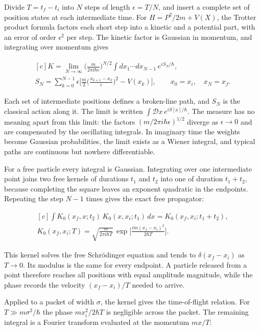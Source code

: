 \documentclass[11pt,oneside]{book}
\newenvironment{centeredalign}{\[\begin{gathered}[c]}{\end{gathered}\]}
\begin{document}
Divide \(T=t_f-t_i\) into \(N\) steps of length \(\epsilon=T/N\), and insert a complete set of position states at each intermediate time. For \(H=P^2/2m+V(X)\), the Trotter product formula factors each short step into a kinetic and a potential part, with an error of order \(\epsilon^2\) per step. The kinetic factor is Gaussian in momentum, and integrating over momentum gives

\begin{centeredalign}
K=\lim_{N\to\infty}\Big(\frac{m}{2\pi i\hbar\epsilon}\Big)^{N/2}
\int dx_1\cdots dx_{N-1}\,e^{iS_N/\hbar},\\
S_N=\sum_{k=0}^{N-1}\epsilon\Big[\frac m2\Big(\frac{x_{k+1}-x_k}{\epsilon}\Big)^2-V(x_k)\Big],
\qquad x_0=x_i,\quad x_N=x_f.
\end{centeredalign}

Each set of intermediate positions defines a broken-line path, and \(S_N\) is the classical action along it. The limit is written \(\int\mathcal Dx\,e^{iS[x]/\hbar}\). The measure has no meaning apart from this limit: the factors \((m/2\pi i\hbar\epsilon)^{1/2}\) diverge as \(\epsilon\to0\) and are compensated by the oscillating integrals. In imaginary time the weights become Gaussian probabilities, the limit exists as a Wiener integral, and typical paths are continuous but nowhere differentiable.

For a free particle every integral is Gaussian. Integrating over one intermediate point joins two free kernels of durations \(t_1\) and \(t_2\) into one of duration \(t_1+t_2\), because completing the square leaves an exponent quadratic in the endpoints. Repeating the step \(N-1\) times gives the exact free propagator:

\begin{centeredalign}
\int K_0(x_f,x;t_2)\,K_0(x,x_i;t_1)\,dx=K_0(x_f,x_i;t_1+t_2),\\
K_0(x_f,x_i;T)=\sqrt{\frac{m}{2\pi i\hbar T}}\,
\exp\Big[\frac{im(x_f-x_i)^2}{2\hbar T}\Big].
\end{centeredalign}

This kernel solves the free Schrödinger equation and tends to \(\delta(x_f-x_i)\) as \(T\to0\). Its modulus is the same for every endpoint. A particle released from a point therefore reaches all positions with equal amplitude magnitude, while the phase records the velocity \((x_f-x_i)/T\) needed to arrive.

Applied to a packet of width \(\sigma\), the kernel gives the time-of-flight relation. For \(T\gg m\sigma^2/\hbar\) the phase \(mx_i^2/2\hbar T\) is negligible across the packet. The remaining integral is a Fourier transform evaluated at the momentum \(mx/T\):
\end{document}
